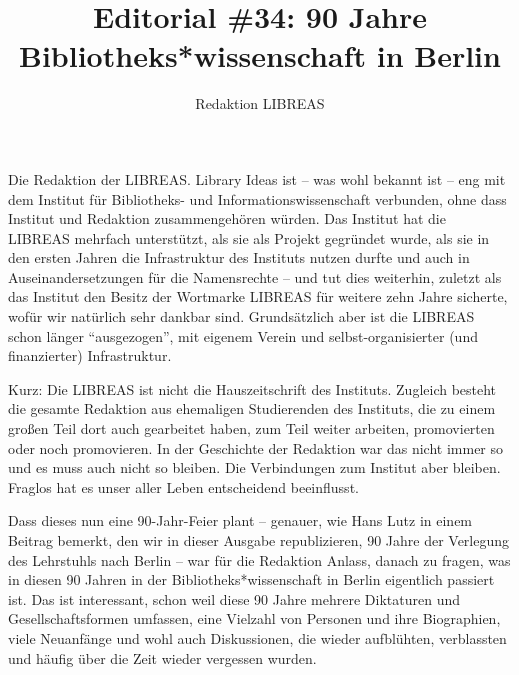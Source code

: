 \documentclass[a4paper,
fontsize=11pt,
oneside,
numbers=noperiodatend,
parskip=half-,
bibliography=totoc,
final
]{scrartcl}
\title{\LARGE{Editorial \#34: 90 Jahre Bibliotheks*wissenschaft in Berlin}} %
\author{Redaktion LIBREAS} %
\date{}
\begin{document}
\maketitle
\thispagestyle{fancyplain} 


Die Redaktion der LIBREAS. Library Ideas ist -- was wohl bekannt ist --
eng mit dem Institut für Bibliotheks- und Informationswissenschaft
verbunden, ohne dass Institut und Redaktion zusammengehören würden. Das
Institut hat die LIBREAS mehrfach unterstützt, als sie als Projekt
gegründet wurde, als sie in den ersten Jahren die Infrastruktur des
Instituts nutzen durfte und auch in Auseinandersetzungen für die
Namensrechte -- und tut dies weiterhin, zuletzt als das Institut den
Besitz der Wortmarke LIBREAS für weitere zehn Jahre sicherte, wofür wir
natürlich sehr dankbar sind. Grundsätzlich aber ist die LIBREAS schon
länger \enquote{ausgezogen}, mit eigenem Verein und selbst-organisierter
(und finanzierter) Infrastruktur.

Kurz: Die LIBREAS ist nicht die Hauszeitschrift des Instituts. Zugleich
besteht die gesamte Redaktion aus ehemaligen Studierenden des Instituts,
die zu einem großen Teil dort auch gearbeitet haben, zum Teil weiter
arbeiten, promovierten oder noch promovieren. In der Geschichte der
Redaktion war das nicht immer so und es muss auch nicht so bleiben. Die
Verbindungen zum Institut aber bleiben. Fraglos hat es unser aller Leben
entscheidend beeinflusst.

Dass dieses nun eine 90-Jahr-Feier plant -- genauer, wie Hans Lutz in
einem Beitrag bemerkt, den wir in dieser Ausgabe republizieren, 90 Jahre
der Verlegung des Lehrstuhls nach Berlin -- war für die Redaktion
Anlass, danach zu fragen, was in diesen 90 Jahren in der
Bibliotheks*wissenschaft in Berlin eigentlich passiert ist. Das ist
interessant, schon weil diese 90 Jahre mehrere Diktaturen und
Gesellschaftsformen umfassen, eine Vielzahl von Personen und ihre
Biographien, viele Neuanfänge und wohl auch Diskussionen, die wieder
aufblühten, verblassten und häufig über die Zeit wieder vergessen
wurden.
\end{document}
